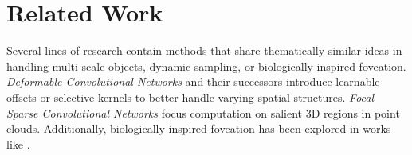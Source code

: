 \section{Related Work}
Several lines of research contain methods that share thematically similar ideas in handling multi-scale objects, dynamic sampling, or biologically inspired foveation.
\emph{Deformable Convolutional Networks} \cite{dai2017deformable} and their successors \cite{zhu2019deformable,xiong2024efficient} introduce learnable offsets or selective kernels to better handle varying spatial structures.
\emph{Focal Sparse Convolutional Networks} \cite{chen2022focal} focus computation on salient 3D regions in point clouds. Additionally, biologically inspired foveation has been explored in works like \cite{lukanov2021biologically,kaplanyan2019deepfovea,thavamani2021fovea}.